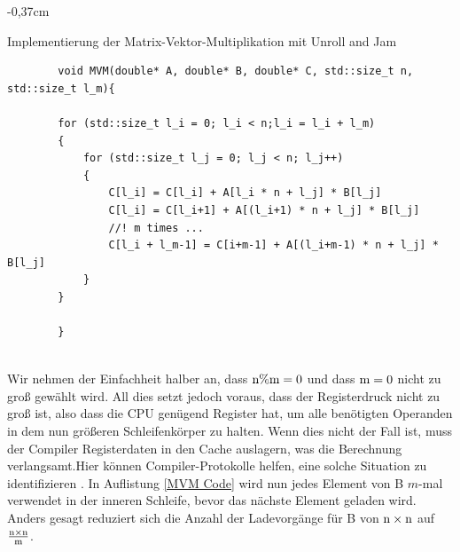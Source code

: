 \documentclass[sigconf,language=ngerman]{acmart}
\begin{document}
\begin{tiny}
    \begin{adjustwidth}{-0,37cm}{}
    \begin{footnotesize}
    \begin{auflistung}
    \caption{Implementierung der Matrix-Vektor-Multiplikation mit Unroll and Jam}
    \label{MVM Code}
    \begin{verbatim}
        void MVM(double* A, double* B, double* C, std::size_t n, std::size_t l_m){

        for (std::size_t l_i = 0; l_i < n;l_i = l_i + l_m)
        {
            for (std::size_t l_j = 0; l_j < n; l_j++)
            {
                C[l_i] = C[l_i] + A[l_i * n + l_j] * B[l_j]
                C[l_i] = C[l_i+1] + A[(l_i+1) * n + l_j] * B[l_j]
                //! m times ...
                C[l_i + l_m-1] = C[i+m-1] + A[(l_i+m-1) * n + l_j] * B[l_j]
            }
        }

        }
        
    \end{verbatim}
    \end{auflistung}
    \end{footnotesize}
    \end{adjustwidth}
    \end{tiny}





Wir nehmen der Einfachheit halber an, dass $\textnormal{n}\%\textnormal{m} = 0$ und dass $\textnormal{m} = 0$ nicht zu groß gewählt wird.
All dies setzt jedoch voraus, 
dass der Registerdruck nicht zu groß ist, 
also dass die CPU genügend Register hat, 
um alle benötigten Operanden in dem nun größeren Schleifenkörper zu halten. Wenn dies nicht der Fall ist, muss der Compiler Registerdaten in den Cache auslagern, 
was die Berechnung verlangsamt.Hier können Compiler-Protokolle helfen, eine solche Situation zu identifizieren \cite{hager-2010v2}.
In Auflistung \ref{MVM Code} wird nun jedes Element von B \(m\)-mal verwendet in der inneren Schleife, bevor das nächste Element geladen wird.
Anders gesagt reduziert sich die Anzahl der Ladevorgänge für B von $\textnormal{n} \times \textnormal{n} $ auf $\frac{\textnormal{n} \times \textnormal{n}}{\textnormal{m}}$.
\end{document}
